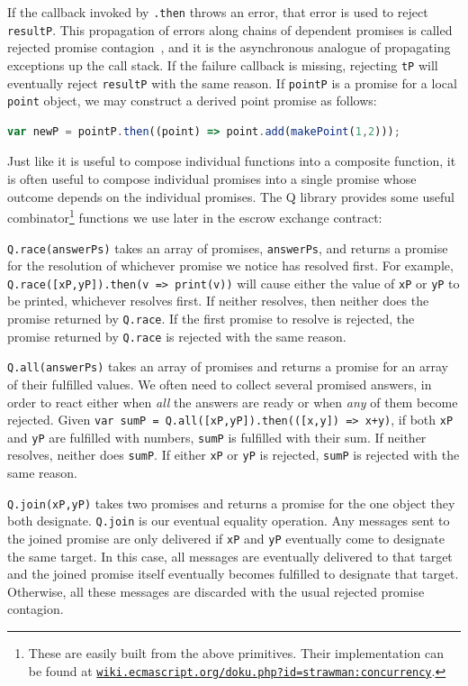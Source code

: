 \documentclass{llncs}
\newcommand{\myurl}[1]{{\href{http://#1}{\texttt{#1}}}}
\begin{document}
If the callback invoked by {\tt .then} throws an error, that error is used to reject {\tt resultP}. This propagation of errors along chains of dependent promises is called rejected promise contagion~\cite{miller:strangers}, and it is the asynchronous analogue of propagating exceptions up the call stack. If the failure callback is missing,  rejecting {\tt tP} will eventually reject {\tt resultP} with the same reason. If {\tt pointP} is a promise for a local {\tt point} object, we may construct a derived point promise as follows:

\begin{lstlisting}[language=JavaScript,numbers=none]
var newP = pointP.then((point) => point.add(makePoint(1,2)));
\end{lstlisting}

Just like it is useful to compose individual functions into a composite function, it is often useful to compose individual promises into a single promise whose outcome depends on the individual promises. The Q library provides some useful combinator\footnote{These are easily built from the above primitives. Their implementation can be found at \myurl{wiki.ecmascript.org/doku.php?id=strawman:concurrency}.} functions we use later in the escrow exchange contract:

\begin{description*}
\item[{\tt Q.race(answerPs)}] takes an array of promises, {\tt answerPs}, and returns a promise for the resolution of whichever promise we notice has resolved first. For example, {\tt Q.race([xP,yP]).then(v => print(v))} will cause either the value of {\tt xP} or {\tt yP} to be printed, whichever resolves first. If neither resolves, then neither does the promise returned by {\tt Q.race}. If the first promise to resolve is rejected, the promise returned by {\tt Q.race} is rejected with the same reason.

\item[{\tt Q.all(answerPs)}] takes an array of promises and returns a promise for an array of their fulfilled values. We often need to collect several promised answers, in order to react either when \emph{all} the answers are ready or when \emph{any} of them become rejected. Given {\tt var~sumP~=~Q.all([xP,yP]).then(([x,y])~=>~x+y)}, if both {\tt xP} and {\tt yP} are fulfilled with numbers, {\tt sumP} is fulfilled with their sum. If neither resolves, neither does {\tt sumP}. If either {\tt xP} or {\tt yP} is rejected, {\tt sumP} is rejected with the same reason.

\item[{\tt Q.join(xP,yP)}] takes two promises and returns a promise for the one object they both designate. {\tt Q.join} is our eventual equality operation. Any messages sent to the joined promise are only delivered if {\tt xP} and {\tt yP} eventually come to designate the same target. In this case, all messages are eventually delivered to that target and the joined promise itself eventually becomes fulfilled to designate that target. Otherwise, all these messages are discarded with the usual rejected promise contagion.
\end{description*}
\end{document}
